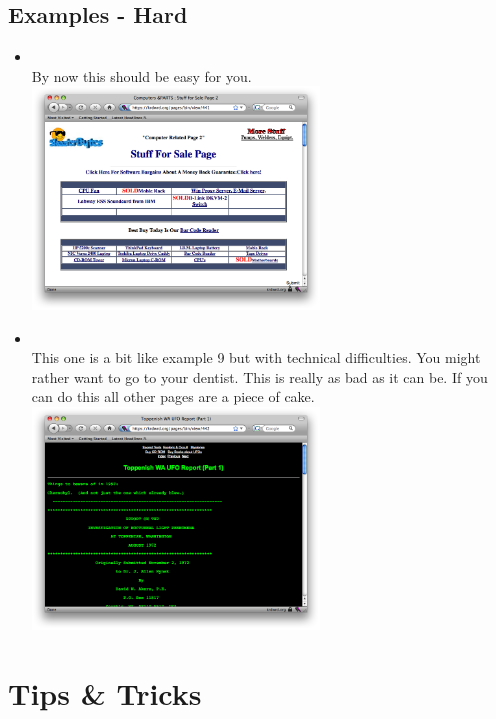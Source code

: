 \documentclass[12pt,a4paper]{article}
\begin{document}
\subsection{Examples - Hard}
\begin{itemize}
% 
\item {}\\
By now this should be easy for you. \\
\includegraphics[width=0.6\textwidth]{images/441.png} \\

\item {} \\
This one is a bit like example 9 but with technical difficulties. You might rather want to go to your dentist. This is really as bad as it can be. If you can do this all other pages are a piece of cake. \\
\includegraphics[width=0.6\textwidth]{images/442.png} \\

\end{itemize}
\section{Tips \& Tricks}
\label{TnT}
\end{document}
